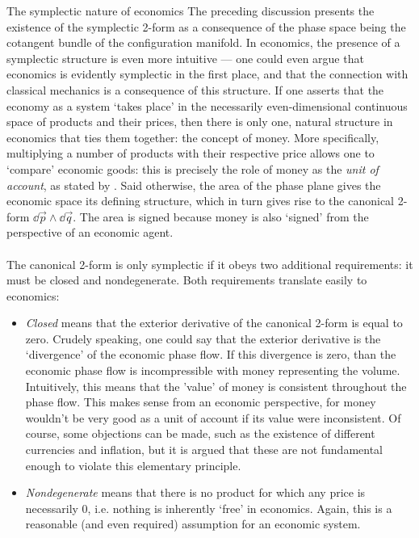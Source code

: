 \begin{econ}{The symplectic nature of economics}
    The preceding discussion presents the existence of the symplectic 2-form as a consequence of the phase space being the cotangent bundle of the configuration manifold. In economics, the presence of a symplectic structure is even more intuitive --- one could even argue that economics is evidently symplectic in the first place, and that the connection with classical mechanics is a consequence of this structure. If one asserts that the economy as a system `takes place' in the necessarily even-dimensional continuous space of products and their prices, then there is only one, natural structure in economics that ties them together: the concept of money. More specifically, multiplying a number of products with their respective price allows one to `compare' economic goods: this is precisely the role of money as the \emph{unit of account}, as stated by \citet{Mankiw2017}. Said otherwise, the area of the phase plane gives the economic space its defining structure, which in turn gives rise to the canonical 2-form $\dd{\vec{p}} \wedge \dd{\vec{q}}$. The area is signed because money is also `signed' from the perspective of an economic agent.
    \\~\\
    The canonical 2-form is only symplectic if it obeys two additional requirements: it must be closed and nondegenerate. Both requirements translate easily to economics:
    \begin{itemize}
        \item \emph{Closed} means that the exterior derivative of the canonical 2-form is equal to zero. Crudely speaking, one could say that the exterior derivative is the `divergence' of the economic phase flow. If this divergence is zero, than the economic phase flow is incompressible with money representing the volume. Intuitively, this means that the 'value' of money is consistent throughout the phase flow. This makes sense from an economic perspective, for money wouldn't be very good as a unit of account if its value were inconsistent. Of course, some objections can be made, such as the existence of different currencies and inflation, but it is argued that these are not fundamental enough to violate this elementary principle. 
        \item \emph{Nondegenerate} means that there is no product for which any price is necessarily 0, i.e. nothing is inherently `free' in economics. Again, this is a reasonable (and even required) assumption for an economic system.

\end{itemize}
\end{econ}
